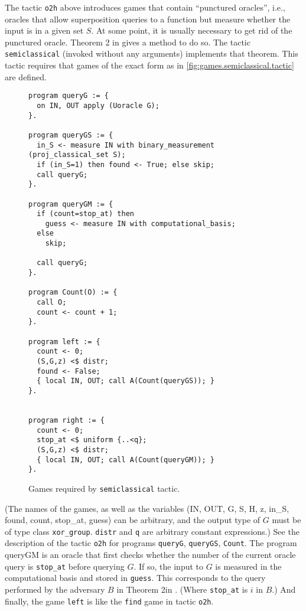 \documentclass{article}
\begin{document}
The tactic \texttt{o2h} above introduces games that contain
``punctured oracles'', i.e., oracles that allow superposition queries
to a function but measure whether the input is in a given set $S$. At
some point, it is usually necessary to get rid of the punctured
oracle. Theorem 2 in \cite{ambainis19semiclassical} gives a method to do so. The
tactic \texttt{semiclassical} (invoked without any arguments) implements that theorem.
This tactic requires that games of the exact
form as in \autoref{fig:games.semiclassical.tactic} are
defined.
%
\begin{figure}[t]
  {\smaller\smaller  \lstset{language=qrhl}
\begin{lstlisting}
program queryG := {
  on IN, OUT apply (Uoracle G);
}.

program queryGS := {
  in_S <- measure IN with binary_measurement (proj_classical_set S);
  if (in_S=1) then found <- True; else skip;
  call queryG;
}.

program queryGM := {
  if (count=stop_at) then
    guess <- measure IN with computational_basis;
  else
    skip;

  call queryG;
}.

program Count(O) := {
  call O;
  count <- count + 1;
}.

program left := {
  count <- 0;
  (S,G,z) <$ distr;
  found <- False;
  { local IN, OUT; call A(Count(queryGS)); }
}.


program right := {
  count <- 0;
  stop_at <$ uniform {..<q};
  (S,G,z) <$ distr;
  { local IN, OUT; call A(Count(queryGM)); }
}.
\end{lstlisting}
  }
  \caption[Games required by semiclassical tactic.]{\label{fig:games.semiclassical.tactic}Games required by \texttt{semiclassical} tactic.}
\end{figure}
%
(The names of the games, as well as the variables (IN,
OUT, G, S, H, z, in\_S, found, count, stop\_at, guess) can be
arbitrary, and the output type of $G$ must be of type class
\texttt{xor\_group}. \texttt{distr} and \texttt{q} are arbitrary
constant expressions.)  See the description of the tactic \texttt{o2h}
for programs \texttt{queryG}, \texttt{queryGS}, \texttt{Count}.  The
program \textrm{queryGM} is an oracle that first checks
whether the number of the current oracle query is \texttt{stop\_at}
before querying $G$.  If so, the input to $G$ is measured in the
computational basis and stored in \texttt{guess}.  This corresponds to
the query performed by the adversary $B$ in
Theorem 2in \cite{ambainis19semiclassical}. (Where \texttt{stop\_at} is $i$ in
$B$.)  And finally, the game \texttt{left} is like the \texttt{find}
game in tactic \texttt{o2h}.
\end{document}

